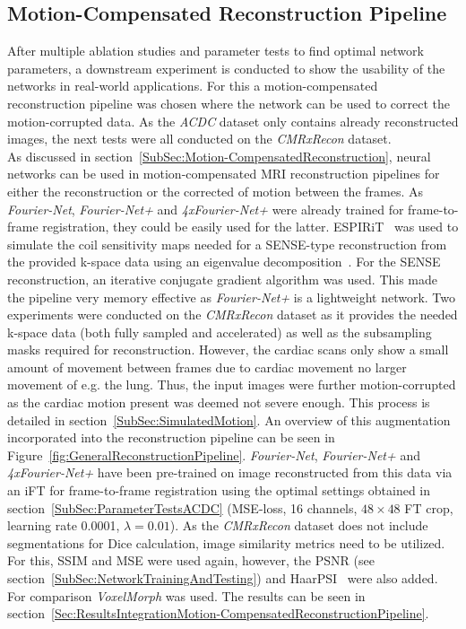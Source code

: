 \subsection{Motion-Compensated Reconstruction Pipeline} \label{SubSec:IntegrationMotion-CompensatedReconstructionPipeline}
After multiple ablation studies and parameter tests to find optimal network parameters, a downstream experiment is conducted to show the usability of the networks in real-world applications. For this a motion-compensated reconstruction pipeline was chosen where the network can be used to correct the motion-corrupted data. As the \emph{ACDC} dataset only contains already reconstructed images, the next tests were all conducted on the \emph{CMRxRecon} dataset.\\
As discussed in section~\ref{SubSec:Motion-CompensatedReconstruction}, neural networks can be used in motion-compensated MRI reconstruction pipelines for either the reconstruction or the corrected of motion between the frames. As \emph{Fourier-Net}, \emph{Fourier-Net+} and \emph{4xFourier-Net+} were already trained for frame-to-frame registration, they could be easily used for the latter. ESPIRiT~\cite{ESPIRiT} was used to simulate the coil sensitivity maps needed for a SENSE-type reconstruction from the provided k-space data using an eigenvalue decomposition~\cite{ESPIRiT}. For the SENSE~\cite{SENSE1} reconstruction, an iterative conjugate gradient algorithm was used. This made the pipeline very memory effective as \emph{Fourier-Net+} is a lightweight network. Two experiments were conducted on the \emph{CMRxRecon} dataset as it provides the needed k-space data (both fully sampled and accelerated) as well as the subsampling masks required for reconstruction. However, the cardiac scans only show a small amount of movement between frames due to cardiac movement no larger movement of e.g. the lung. Thus, the input images were further motion-corrupted as the cardiac motion present was deemed not severe enough. This process is detailed in section~\ref{SubSec:SimulatedMotion}. An overview of this augmentation incorporated into the reconstruction pipeline can be seen in Figure~\ref{fig:GeneralReconstructionPipeline}. \emph{Fourier-Net}, \emph{Fourier-Net+} and \emph{4xFourier-Net+} have been pre-trained on image reconstructed from this data via an iFT for frame-to-frame registration using the optimal settings obtained in section~\ref{SubSec:ParameterTestsACDC} (MSE-loss, 16 channels, $48 \times 48$ FT crop, learning rate 0.0001, $\lambda=0.01$). As the \emph{CMRxRecon} dataset does not include segmentations for Dice calculation, image similarity metrics need to be utilized. For this, SSIM and MSE were used again, however, the PSNR (see section~\ref{SubSec:NetworkTrainingAndTesting}) and HaarPSI~\cite{HaarPSI} were also added. For comparison \emph{VoxelMorph} was used. The results can be seen in section~\ref{Sec:ResultsIntegrationMotion-CompensatedReconstructionPipeline}.


